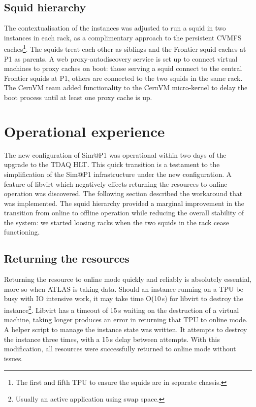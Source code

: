 \documentclass{webofc}
\begin{document}
\subsection{Squid hierarchy}
\label{sec:hierarchy}
The contextualisation of the instances was adjusted to run a squid in two
instances in each rack, as a complimentary approach to the persistent CVMFS
caches\footnote{The first and fifth TPU to ensure the squids are in
separate chassis.}. The squids treat each other as siblings and the Frontier
squid caches at P1 as parents. A web proxy-autodiscovery service is set up to
connect virtual machines to proxy caches on boot: those serving a squid
connect to the central Frontier squids at P1, others are connected to the two
squids in the same rack. The CernVM team added functionality to the CernVM
micro-kernel to delay the boot process until at least one proxy cache is up.


\section{Operational experience}
\label{sec:ops}
The new configuration of Sim@P1 was operational within two days of the upgrade
to the TDAQ HLT. This quick transition is a testament to the simplification of
the Sim@P1 infrastructure under the new configuration. A feature of libvirt
which negatively effects returning the resources to online operation was
discovered. The following section described the workaround that was implemented.
The squid hierarchy provided a marginal improvement in the transition from
online to offline operation while reducing the overall stability of the system:
we started loosing racks when the two squids in the rack cease functioning.

\subsection{Returning the resources}
\label{sec:return}
Returning the resource to online mode quickly and reliably is absolutely
essential, more so when ATLAS is taking data. Should an instance running on a
TPU be busy with IO intensive work, it may take time O(10\,\textrm{s}) for
libvirt to destroy the instance\footnote{Usually an active application using
swap space.}. Libvirt has a timeout of 15\,\textrm{s} waiting on the destruction
of a virtual machine, taking longer produces an error in returning that TPU to
online mode. A helper script to manage the instance state was written. It
attempts to destroy the instance three times, with a 15\,\textrm{s} delay between
attempts. With this modification, all resources were successfully returned to
online mode without issues.
\end{document}
